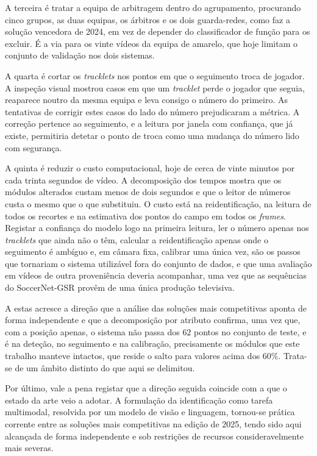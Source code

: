 A terceira é tratar a equipa de arbitragem dentro do agrupamento, procurando cinco grupos, as duas
equipas, os árbitros e os dois guarda-redes, como faz a solução vencedora de 2024, em vez de
depender do classificador de função para os excluir. É a via para os vinte vídeos da equipa de
amarelo, que hoje limitam o conjunto de validação nos dois sistemas.

A quarta é cortar os \emph{tracklets} nos pontos em que o seguimento troca de jogador. A inspeção
visual mostrou casos em que um \emph{tracklet} perde o jogador que seguia, reaparece noutro da mesma
equipa e leva consigo o número do primeiro. As tentativas de corrigir estes casos do lado do número
prejudicaram a métrica. A correção pertence ao seguimento, e a leitura por janela com confiança, que
já existe, permitiria detetar o ponto de troca como uma mudança do número lido com segurança.

A quinta é reduzir o custo computacional, hoje de cerca de vinte minutos por cada trinta segundos de
vídeo. A decomposição dos tempos mostra que os módulos alterados custam menos de dois segundos e que
o leitor de números custa o mesmo que o que substituiu. O custo está na reidentificação, na leitura
de todos os recortes e na estimativa dos pontos do campo em todos os \emph{frames}. Registar a confiança do modelo logo na primeira leitura, ler o número
apenas nos \emph{tracklets} que ainda não o têm, calcular a reidentificação apenas onde o seguimento
é ambíguo e, em câmara fixa, calibrar uma única vez, são os passos que tornariam o sistema
utilizável fora do conjunto de dados, e que uma avaliação em vídeos de outra proveniência deveria
acompanhar, uma vez que as sequências do SoccerNet-GSR provêm de uma única produção televisiva.

A estas acresce a direção que a análise das soluções mais competitivas aponta de forma independente
e que a decomposição por atributo confirma, uma vez que, com a posição apenas, o sistema não passa dos
$62$ pontos no conjunto de teste, e é na deteção, no seguimento e na calibração,
precisamente os módulos que este trabalho manteve intactos, que reside o salto para valores acima
dos $60\%$. Trata-se de um âmbito distinto do que aqui se delimitou.

Por último, vale a pena registar que a direção seguida coincide com a que o estado da arte veio a
adotar. A formulação da identificação como tarefa multimodal, resolvida por um modelo de visão e
linguagem, tornou-se prática corrente entre as soluções mais competitivas na edição de 2025, tendo
sido aqui alcançada de forma independente e sob restrições de recursos consideravelmente mais
severas.
